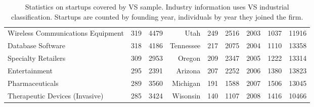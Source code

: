 \begin{table}[!htb]
\begin{tabular}{p{4.5cm}llrllrll}
  Wireless Communications Equipment & 319 & 4479 & Utah & 249 & 2516 & 2003 & 1037 & 11916 \\ 
  Database Software & 318 & 4186 & Tennessee & 217 & 2075 & 2004 & 1110 & 13358 \\ 
  Specialty Retailers & 309 & 2953 & Oregon & 209 & 2347 & 2005 & 1222 & 13314 \\ 
  Entertainment & 295 & 2391 & Arizona & 207 & 2252 & 2006 & 1380 & 13823 \\ 
  Pharmaceuticals & 289 & 3560 & Michigan & 191 & 1588 & 2007 & 1506 & 13045 \\ 
  Therapeutic Devices (Invasive) & 285 & 3424 & Wisonsin & 140 & 1107 & 2008 & 1416 & 10466 \\ 
   \bottomrule
\end{tabular}
\endgroup
\caption{Statistics on startups covered by VS sample. Industry information uses VS industrial classification. Startups are counted by founding year, individuals by year they joined the firm.} 
\label{table:VS_summaryTable}
\end{table}
